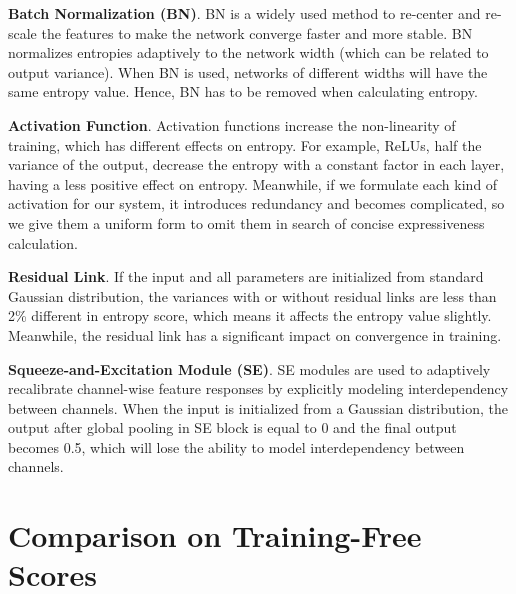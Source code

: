 \documentclass{article} \usepackage{iclr2023_conference,times}
\begin{document}
\noindent\textbf{Batch Normalization (BN)}.
BN is a widely used method to re-center and re-scale the features to make the network converge faster and more stable. BN normalizes entropies adaptively to the network width (which can be related to output variance). When BN is used, networks of different widths will have the same entropy value. Hence, BN has to be removed when calculating entropy.

\noindent\textbf{Activation Function}. 
Activation functions increase the non-linearity of training, which has different effects on entropy. For example, ReLUs, half the variance of the output, decrease the entropy with a constant factor in each layer, having a less positive effect on entropy. Meanwhile, if we formulate each kind of activation for our system, it introduces redundancy and becomes complicated, so we give them a uniform form to omit them in search of concise expressiveness calculation. 



\noindent\textbf{Residual Link}.
If the input and all parameters are initialized from standard Gaussian distribution, the variances with or without residual links are less than 2\% different in entropy score, which means it affects the entropy value slightly. Meanwhile, the residual link has a significant impact on convergence in training.


\noindent\textbf{Squeeze-and-Excitation Module (SE)}.
SE modules are used to adaptively recalibrate channel-wise feature responses by explicitly modeling interdependency between channels. When the input is initialized from a Gaussian distribution, the output after global pooling in SE block is equal to 0 and the final output becomes 0.5, which will lose the ability to model interdependency between channels.


\section{Comparison on Training-Free Scores}
\label{sec:entropy comparison}
\end{document}
